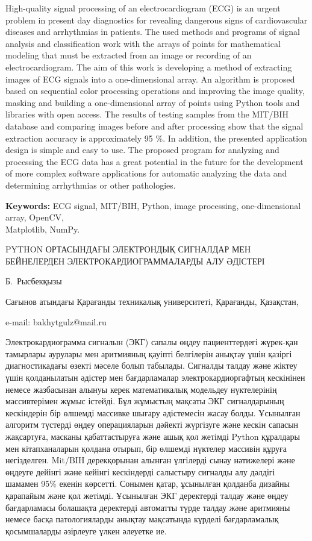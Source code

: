High-quality signal processing of an electrocardiogram (ECG) is an
urgent problem in present day diagnostics for revealing dangerous signs
of cardiovascular diseases and arrhythmias in patients. The used methods
and programs of signal analysis and classification work with the arrays
of points for mathematical modeling that must be extracted from an image
or recording of an electrocardiogram. The aim of this work is developing
a method of extracting images of ECG signals into a one-dimensional
array. An algorithm is proposed based on sequential color processing
operations and improving the image quality, masking and building a
one-dimensional array of points using Python tools and libraries with
open access. The results of testing samples from the MIT/BIH database
and comparing images before and after processing show that the signal
extraction accuracy is approximately 95 \%. In addition, the presented
application design is simple and easy to use. The proposed program for
analyzing and processing the ECG data has a great potential in the
future for the development of more complex software applications for
automatic analyzing the data and determining arrhythmias or other
pathologies.

{\bfseries Keywords:} ECG signal, MIT/BIH, Python, image processing,
one-dimensional array, OpenCV, \\Matplotlib, NumPy.

\begin{header}
PYTHON ОРТАСЫНДАҒЫ ЭЛЕКТРОНДЫҚ СИГНАЛДАР МЕН БЕЙНЕЛЕРДЕН ЭЛЕКТРОКАРДИОГРАММАЛАРДЫ АЛУ ӘДІСТЕРІ

Б.~Рысбекқызы
\end{header}

\begin{affil}
Сағынов атындағы Қарағанды техникалық университеті, Қарағанды, Қазақстан,

e-mail: bakhytgulz@mail.ru
\end{affil}

Электрокардиограмма сигналын (ЭКГ) сапалы өңдеу пациенттердегі жүрек-қан
тамырлары аурулары мен аритмияның қауіпті белгілерін анықтау үшін
қазіргі диагностикадағы өзекті мәселе болып табылады. Сигналды талдау
және жіктеу үшін қолданылатын әдістер мен бағдарламалар
электрокардиоргафтың кескінінен немесе жазбасынан алынуы керек
математикалық модельдеу нүктелерінің массивтерімен жұмыс істейді. Бұл
жұмыстың мақсаты ЭКГ сигналдарының кескіндерін бір өлшемді массивке
шығару әдістемесін жасау болды. Ұсынылған алгоритм түстерді өңдеу
операцияларын дәйекті жүргізуге және кескін сапасын жақсартуға, масканы
қабаттастыруға және ашық қол жетімді Python құралдары мен кітапханаларын
қолдана отырып, бір өлшемді нүктелер массивін құруға негізделген.
Mit/BIH дерекқорынан алынған үлгілерді сынау нәтижелері және өңдеуге
дейінгі және кейінгі кескіндерді салыстыру сигналды алу дәлдігі шамамен
95\% екенін көрсетті. Сонымен қатар, ұсынылған қолданба дизайны
қарапайым және қол жетімді. Ұсынылған ЭКГ деректерді талдау және өңдеу
бағдарламасы болашақта деректерді автоматты түрде талдау және аритмияны
немесе басқа патологияларды анықтау мақсатында күрделі бағдарламалық
қосымшаларды әзірлеуге үлкен әлеуетке ие.

